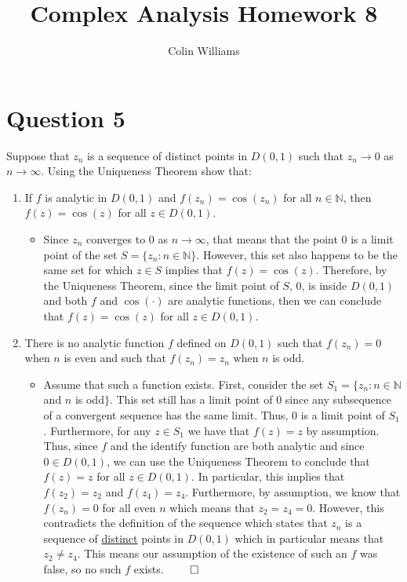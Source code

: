 \documentclass[10pt,a4paper]{article}
\title{Complex Analysis Homework 8}
\author{Colin Williams}
\theoremstyle{definition}
\begin{document}
\maketitle

\section*{Question 5}
Suppose that $z_n$ is a sequence of distinct points in $D(0,1)$ such that $z_n \to 0$ as $n \to \infty$. Using the Uniqueness Theorem show that:
\begin{enumerate}[label = (\alph*)]
\item If $f$ is analytic in $D(0,1)$ and $f(z_n) = \cos(z_n)$ for all $n \in \mathbb{N}$, then $f(z) = \cos(z)$ for all $z \in D(0,1)$.
	\begin{itemize}
	\item Since $z_n$ converges to 0 as $n \to \infty$, that means that the point 0 is a limit point of the set $S = \{z_n : n \in \mathbb{N}\}$. However, this set also happens to be the same set for which $z \in S$ implies that $f(z) = \cos(z)$. Therefore, by the Uniqueness Theorem, since the limit point of $S$, 0, is inside $D(0,1)$ and both $f$ and $\cos(\cdot)$ are analytic functions, then we can conclude that $f(z) = \cos(z)$ for all $z \in D(0,1)$.
	\end{itemize}
\item There is no analytic function $f$ defined on $D(0,1)$ such that $f(z_n) = 0$ when $n$ is even and such that $f(z_n) = z_n$ when $n$ is odd.
	\begin{itemize}
	\item Assume that such a function exists. First, consider the set $S_1 = \{z_n : n \in \mathbb{N}$ and $n$ is odd$\}$. This set still has a limit point of 0 since any subsequence of a convergent sequence has the same limit. Thus, 0 is a limit point of $S_1$. Furthermore, for any $z \in S_1$ we have that $f(z) = z$ by assumption. Thus, since $f$ and the identify function are both analytic and since $0 \in D(0,1)$, we can use the Uniqueness Theorem to conclude that $f(z) = z$ for all $z \in D(0,1)$. In particular, this implies that $f(z_2) = z_2$ and $f(z_4) = z_4$. Furthermore, by assumption, we know that $f(z_n) = 0$ for all even $n$ which means that $z_2 = z_4 = 0$. However, this contradicts the definition of the sequence which states that $z_n$ is a sequence of \underline{distinct} points in $D(0,1)$ which in particular means that $z_2 \neq z_4$. This means our assumption of the existence of such an $f$ was false, so no such $f$ exists. $\qed$
	\end{itemize}
\end{enumerate}
\end{document}
